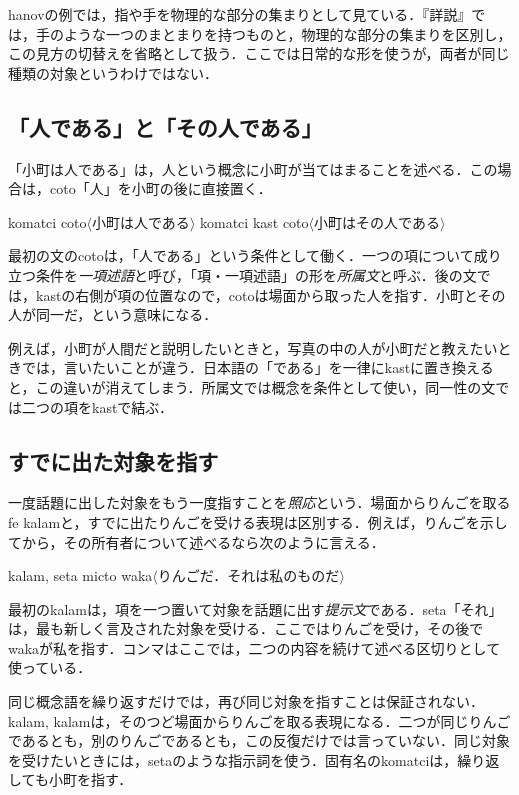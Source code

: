 \documentclass[b5paper, 10pt]{ltjsarticle}
\newcommand{\ko}[1]{\textsf{#1}}
\newcommand{\sentence}[1]{$\langle$#1$\rangle$}
\begin{document}
\begin{remark}
    \ko{hanov}の例では，指や手を物理的な部分の集まりとして見ている．『詳説』では，手のような一つのまとまりを持つものと，物理的な部分の集まりを区別し，この見方の切替えを省略として扱う．ここでは日常的な形を使うが，両者が同じ種類の対象というわけではない．
\end{remark}

\subsection{「人である」と「その人である」}
「小町は人である」は，人という概念に小町が当てはまることを述べる．この場合は，\ko{coto}「人」を小町の後に直接置く．
\begin{exe}
    \ex \ko{komatci coto}\hfill \sentence{小町は人である}
    \ex \ko{komatci kast coto}\hfill \sentence{小町はその人である}
\end{exe}
最初の文の\ko{coto}は，「人である」という条件として働く．一つの項について成り立つ条件を\emph{一項述語}と呼び，「項・一項述語」の形を\emph{所属文}と呼ぶ．後の文では，\ko{kast}の右側が項の位置なので，\ko{coto}は場面から取った人を指す．小町とその人が同一だ，という意味になる．

例えば，小町が人間だと説明したいときと，写真の中の人が小町だと教えたいときでは，言いたいことが違う．日本語の「である」を一律に\ko{kast}に置き換えると，この違いが消えてしまう．所属文では概念を条件として使い，同一性の文では二つの項を\ko{kast}で結ぶ．

\subsection{すでに出た対象を指す}
一度話題に出した対象をもう一度指すことを\emph{照応}という．場面からりんごを取る\ko{fe kalam}と，すでに出たりんごを受ける表現は区別する．例えば，りんごを示してから，その所有者について述べるなら次のように言える．
\begin{exe}
    \ex \ko{kalam, seta micto waka}\hfill \sentence{りんごだ．それは私のものだ}
\end{exe}
最初の\ko{kalam}は，項を一つ置いて対象を話題に出す\emph{提示文}である．\ko{seta}「それ」は，最も新しく言及された対象を受ける．ここではりんごを受け，その後で\ko{waka}が私を指す．コンマはここでは，二つの内容を続けて述べる区切りとして使っている．

同じ概念語を繰り返すだけでは，再び同じ対象を指すことは保証されない．\ko{kalam, kalam}は，そのつど場面からりんごを取る表現になる．二つが同じりんごであるとも，別のりんごであるとも，この反復だけでは言っていない．同じ対象を受けたいときには，\ko{seta}のような指示詞を使う．固有名の\ko{komatci}は，繰り返しても小町を指す．
\end{document}
